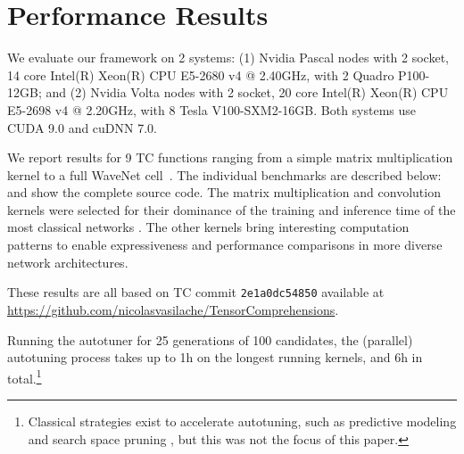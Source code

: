 \section{Performance Results}

We evaluate our framework on 2 systems:
(1) Nvidia Pascal nodes with 2 socket, 14 core Intel(R) Xeon(R) CPU E5-2680
v4 @ 2.40GHz, with 2 Quadro P100-12GB; and
(2) Nvidia Volta nodes with 2 socket, 20 core Intel(R) Xeon(R) CPU E5-2698
v4 @ 2.20GHz, with 8 Tesla V100-SXM2-16GB.
Both systems use CUDA 9.0 and cuDNN 7.0.

We report results for 9 TC functions ranging from a simple matrix
multiplication kernel to a full WaveNet cell~\cite{WaveNet}. The
individual benchmarks are described below:  and
 show the complete source code. The matrix
multiplication and convolution kernels were selected for their
dominance of the training and inference time of the most classical
networks \cite{Awan:2017:IPC:3146347.3146356,ResNext}. The other
kernels bring interesting computation patterns to enable
expressiveness and performance comparisons in more diverse network
architectures.

These results are all based on TC commit
\texttt{2e1a0dc54850} %
available at \\
\url{https://github.com/nicolasvasilache/TensorComprehensions}.

Running the autotuner for 25 generations of 100 candidates, the
(parallel) autotuning process takes up to 1h on the longest running
kernels, and 6h in total.\footnote{Classical strategies exist to
  accelerate autotuning, such as predictive modeling and search space
  pruning \cite{Agakov:2006:UML:1121992.1122412}, but this was not the
  focus of this paper.}

